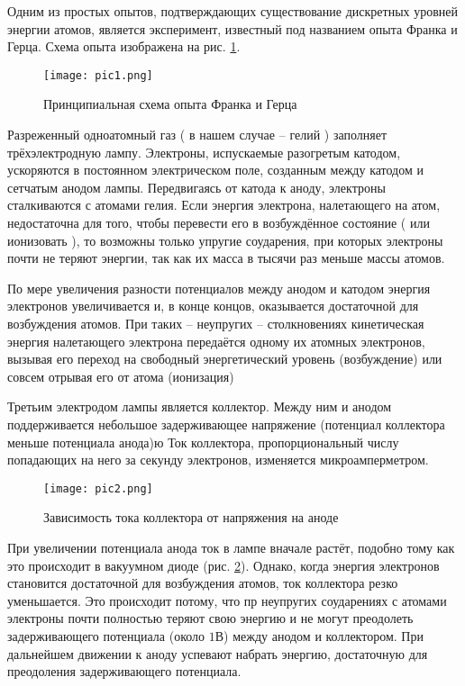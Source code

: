 Одним из простых опытов, подтверждающих существование дискретных уровней энергии
атомов, является эксперимент, известный под названием опыта Франка и Герца.
Схема опыта изображена на рис. \ref{pic1}.

\begin{figure}[h]
  \center
  \texttt{[image: pic1.png]}
  \caption{ Принципиальная схема опыта Франка и Герца }
  \label{pic1}
\end{figure}

Разреженный одноатомный газ ( в нашем случае -- гелий ) заполняет
трёхэлектродную лампу. Электроны, испускаемые разогретым катодом, ускоряются в
постоянном электрическом поле, созданным между катодом и сетчатым анодом лампы.
Передвигаясь от катода к аноду, электроны сталкиваются с атомами гелия. Если
энергия электрона, налетающего на атом, недостаточна для того, чтобы перевести
его в возбуждённое состояние ( или ионизовать ), то возможны только упругие
соударения, при которых электроны почти не теряют энергии, так как их масса в
тысячи раз меньше массы атомов.

По мере увеличения разности потенциалов между анодом и катодом энергия
электронов увеличивается и, в конце концов, оказывается достаточной для
возбуждения атомов. При таких -- неупругих -- столкновениях кинетическая энергия
налетающего электрона передаётся одному их атомных электронов, вызывая его
переход на свободный энергетический уровень (возбуждение) или совсем отрывая его
от атома (ионизация)

Третьим электродом лампы является коллектор. Между ним и анодом поддерживается
небольшое задерживающее напряжение (потенциал коллектора меньше потенциала
анода)ю Ток коллектора, пропорциональный числу попадающих на него за секунду
электронов, изменяется микроамперметром.

\begin{figure}[h]
  \center
  \texttt{[image: pic2.png]}
  \caption{ Зависимость тока коллектора от напряжения на аноде }
  \label{pic2}
\end{figure}

При увеличении потенциала анода ток в лампе вначале растёт, подобно тому как это
происходит в вакуумном диоде (рис. \ref{pic2}). Однако, когда энергия электронов
становится достаточной для возбуждения атомов, ток коллектора резко уменьшается.
Это происходит потому, что пр неупругих соударениях с атомами электроны почти
полностью теряют свою энергию и не могут преодолеть задерживающего потенциала
(около $1$В) между анодом и коллектором. При дальнейшем движении к аноду
успевают набрать энергию, достаточную для преодоления задерживающего потенциала.

